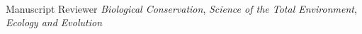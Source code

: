 \\

\begin{cvskills}
  \cvskill
    {Manuscript Reviewer} %
    {\emph{Biological Conservation}, \emph{Science of the Total Environment}, \emph{Ecology and Evolution}} %
\end{cvskills}

